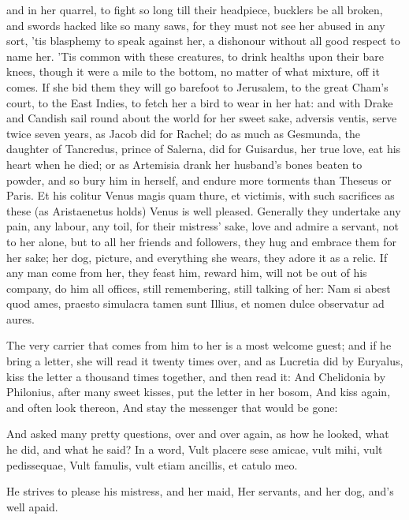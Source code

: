 {and in her quarrel, to fight so long till their headpiece,
bucklers be all broken, and swords hacked like so many saws, for they
must not see her abused in any sort, 'tis blasphemy to speak against
her, a dishonour without all good respect to name her. 'Tis common with
these creatures, to drink healths upon their bare knees, though
it were a mile to the bottom, no matter of what mixture, off it comes.
If she bid them they will go barefoot to Jerusalem, to the great Cham's
court,  to the East Indies, to fetch her a bird to wear in her
hat: and with Drake and Candish sail round about the world for her
sweet sake, adversis ventis, serve twice seven years, as Jacob did for
Rachel; do as much as Gesmunda, the daughter of Tancredus, prince
of Salerna, did for Guisardus, her true love, eat his heart when he
died; or as Artemisia drank her husband's bones beaten to powder, and
so bury him in herself, and endure more torments than Theseus or Paris.
Et his colitur Venus magis quam thure, et victimis, with such
sacrifices as these (as  Aristaenetus holds) Venus is well
pleased. Generally they undertake any pain, any labour, any toil, for
their mistress' sake, love and admire a servant, not to her alone, but
to all her friends and followers, they hug and embrace them for her
sake; her dog, picture, and everything she wears, they adore it as a
relic. If any man come from her, they feast him, reward him, will not
be out of his company, do him all offices, still remembering, still
talking of her:
Nam si abest quod ames, praesto simulacra tamen sunt
Illius, et nomen dulce observatur ad aures.

The very carrier that comes from him to her is a most welcome guest;
and if he bring a letter, she will read it twenty times over, and as
 Lucretia did by Euryalus, kiss the letter a thousand times
together, and then read it: And Chelidonia by Philonius, after
many sweet kisses, put the letter in her bosom,
And kiss again, and often look thereon,
And stay the messenger that would be gone:

And asked many pretty questions, over and over again, as how he looked,
what he did, and what he said? In a word,
Vult placere sese amicae, vult mihi, vult pedissequae,
Vult famulis, vult etiam ancillis, et catulo meo.

He strives to please his mistress, and her maid,
Her servants, and her dog, and's well apaid.

}
